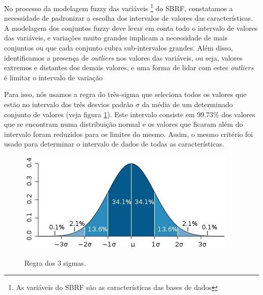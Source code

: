 \documentclass[template.tex]{subfiles}
\begin{document}
No processo da modelagem fuzzy das variáveis \footnote{As variáveis do SBRF são as características das bases de dados} do SBRF, constatamos a necessidade de padronizar a escolha dos intervalos de valores das características. A modelagem dos conjuntos fuzzy deve levar em conta todo o intervalo de valores das variáveis, e variações muito grandes implicam a necessidade de mais conjuntos ou que cada conjunto cubra sub-intervalos grandes. Além disso, identificamos a presença de \textit{outliers} nos valores das variáveis, ou seja, valores extremos e distantes dos demais valores, e uma forma de lidar com estes \textit{outliers} é limitar o intervalo de variação



Para isso, nós usamos a regra do três-sigma \cite{kazmier2004schaum} que seleciona todos os valores que estão no intervalo dos três desvios padrão $\sigma$ da média de um determinado conjunto de valores (veja figura \ref{figura:regra_3_sigmas}). Este intervalo consiste em 99,73\% dos valores que se encontram numa distribuição normal e os valores que ficaram além do intervalo foram reduzidos para os limites do mesmo. Assim, o mesmo critério foi usado para determinar o intervalo de dados de todas as características. 

\begin{figure}[h]
\caption{Regra dos 3 sigmas.}
\centering
\includegraphics[scale=0.85]{regra-dos-3-sigma.png}
\label{figura:regra_3_sigmas}
\end{figure}
\end{document}
